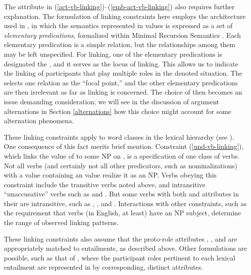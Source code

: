 \documentclass[output=paper
	        ,collection
	        ,collectionchapter
 	        ,biblatex
                ,babelshorthands
                ,newtxmath
                ,draftmode
                ,colorlinks, citecolor=brown
]{langscibook}
\begin{document}
The  attribute in (\ref{act-vb-linking})--(\ref{emb-act-vb-linking}) also requires further explanation.
The formulation of linking constraints here employs the architecture used in \citet{KoenigandDavis2006}, in which the semantics represented in \content values is expressed as a set of \emph{elementary predications}, formalized within Minimal Recursion Semantics \citep{Copestakeetal2001,Copestakeetal2005}.
Each elementary predication is a simple relation, but the relationships among them may be left unspecified.
For linking, one of the elementary predications is designated the , and it serves as the locus of linking.
This allows us to %
indicate the linking of participants that play multiple roles in the denoted situation. 
The  selects one relation as the ``focal point,'' and the other elementary predications are then irrelevant as far as linking is concerned. 
The choice of  then becomes an issue demanding consideration; we will see in the discussion of argument alternations  in Section \ref{alternations} how this choice might account for some alternation phenomena.

These linking constraints apply to word classes in the lexical hierarchy
 (see ).
One consequence of this fact merits brief mention.
Constraint (\ref{und-vb-linking}), which links the value of  to some NP on \argst, is a specification of one class of verbs.
Not all verbs (and certainly not all other predicators, such as nominalizations) with a \content value containing an  value realize it as an NP.
Verbs obeying this constraint include the transitive verbs noted above, and intransitive ``unaccusative'' verbs such as  and .
But some verbs with both  and  attributes in their \content are intransitive, such as , , and .
Interactions with other constraints, such as the requirement that verbs (in English, at least) have an NP subject, determine the range of observed linking patterns.

These linking constraints also assume that the proto-role  attributes , , and  are appropriately matched to entailments, as described above.
Other formulations are possible, such as that of \citet{KoenigandDavis2003}, where the participant roles  pertinent to each lexical entailment are represented in \content by corresponding, distinct attributes.
\end{document}
